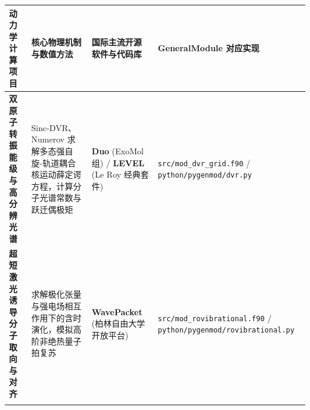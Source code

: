 \documentclass[
]{ctexbook}
\begin{document}
\begin{longtable}[]{@{}llll@{}}
\toprule
\begin{minipage}[b]{0.22\columnwidth}\raggedright
动力学计算项目\strut
\end{minipage} & \begin{minipage}[b]{0.22\columnwidth}\raggedright
核心物理机制与数值方法\strut
\end{minipage} & \begin{minipage}[b]{0.22\columnwidth}\raggedright
国际主流开源软件与代码库\strut
\end{minipage} & \begin{minipage}[b]{0.22\columnwidth}\raggedright
GeneralModule 对应实现\strut
\end{minipage}\tabularnewline
\midrule
\endhead
\begin{minipage}[t]{0.22\columnwidth}\raggedright
\textbf{双原子转振能级与高分辨光谱}\strut
\end{minipage} & \begin{minipage}[t]{0.22\columnwidth}\raggedright
Sinc-DVR、Numerov
求解多态强自旋-轨道耦合核运动薛定谔方程，计算分子光谱常数与跃迁偶极矩\strut
\end{minipage} & \begin{minipage}[t]{0.22\columnwidth}\raggedright
\textbf{Duo} (ExoMol 组) / \textbf{LEVEL} (Le Roy 经典套件)\strut
\end{minipage} & \begin{minipage}[t]{0.22\columnwidth}\raggedright
\texttt{src/mod\_dvr\_grid.f90} / \texttt{python/pygenmod/dvr.py}\strut
\end{minipage}\tabularnewline
\begin{minipage}[t]{0.22\columnwidth}\raggedright
\textbf{超短激光诱导分子取向与对齐}\strut
\end{minipage} & \begin{minipage}[t]{0.22\columnwidth}\raggedright
求解极化张量与强电场相互作用下的含时演化，模拟高阶非绝热量子拍复苏\strut
\end{minipage} & \begin{minipage}[t]{0.22\columnwidth}\raggedright
\textbf{WavePacket} (柏林自由大学开放平台)\strut
\end{minipage} & \begin{minipage}[t]{0.22\columnwidth}\raggedright
\texttt{src/mod\_rovibrational.f90} /
\texttt{python/pygenmod/rovibrational.py}\strut
\end{minipage}\tabularnewline
\begin{minipage}[t]{0.22\columnwidth}\raggedright

\end{minipage}
\end{longtable}
\end{document}
